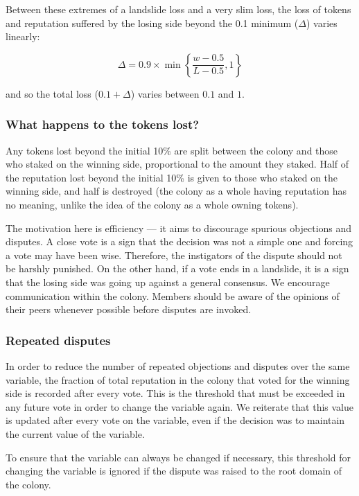 Between these extremes of a landslide loss and a very slim loss, the loss of tokens and reputation suffered by the losing side beyond the 0.1 minimum ($\Delta$) varies linearly:

\begin{equation}
 \Delta = 0.9 \times \min \left\lbrace \frac{w-0.5}{L-0.5}, 1 \right\rbrace
\end{equation}

\noindent and so the total loss ($0.1 + \Delta$) varies between $0.1$ and $1$.

\subsubsection*{What happens to the tokens lost?}

Any tokens lost beyond the initial 10\% are split between the colony and those who staked on the winning side, proportional to the amount they staked. Half of the reputation lost beyond the initial 10\% is given to those who staked on the winning side, and half is destroyed (the colony as a whole having reputation has no meaning, unlike the idea of the colony as a whole owning tokens).

The motivation here is efficiency --- it aims to discourage spurious objections and disputes. A close vote is a sign that the decision was not a simple one and forcing a vote may have been wise. Therefore, the instigators of the dispute should not be harshly punished. On the other hand, if a vote ends in a landslide, it is a sign that the losing side was going up against a general consensus. We encourage communication within the colony. Members should be aware of the opinions of their peers whenever possible before disputes are invoked.

\subsubsection*{Repeated disputes}\label{sec:repeated-disputes}

In order to reduce the number of repeated objections and disputes over the same variable, the fraction of total reputation in the colony that voted for the winning side is recorded after every vote. This is the threshold that must be exceeded in any future vote in order to change the variable again. We reiterate that this value is updated after every vote on the variable, even if the decision was to maintain the current value of the variable.

To ensure that the variable can always be changed if necessary, this threshold for changing the variable is ignored if the dispute was raised to the root domain of the colony.


